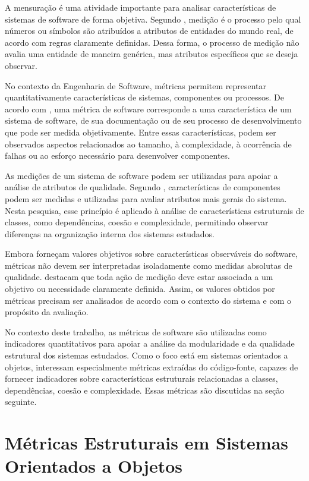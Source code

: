 A mensuração é uma atividade importante para analisar características de sistemas de software de forma objetiva. 
Segundo , medição é o processo pelo qual números ou símbolos são atribuídos a atributos de 
entidades do mundo real, de acordo com regras claramente definidas. Dessa forma, o processo de medição não avalia uma 
entidade de maneira genérica, mas atributos específicos que se deseja observar.

No contexto da Engenharia de Software, métricas permitem representar quantitativamente características de sistemas, componentes 
ou processos. De acordo com , uma métrica de software corresponde a uma característica de um sistema 
de software, de sua documentação ou de seu processo de desenvolvimento que pode ser medida objetivamente. Entre essas características, 
podem ser observados aspectos relacionados ao tamanho, à complexidade, à ocorrência de falhas ou ao esforço necessário para 
desenvolver componentes.

As medições de um sistema de software podem ser utilizadas para apoiar a análise de atributos de qualidade. Segundo 
, características de componentes podem ser medidas e utilizadas para avaliar atributos mais gerais 
do sistema. Nesta pesquisa, esse princípio é aplicado à análise de características estruturais de classes, como dependências, coesão 
e complexidade, permitindo observar diferenças na organização interna dos sistemas estudados.

Embora forneçam valores objetivos sobre características observáveis do software, métricas não devem ser interpretadas isoladamente 
como medidas absolutas de qualidade.  destacam que toda ação de medição deve estar associada a um objetivo 
ou necessidade claramente definida. Assim, os valores obtidos por métricas precisam ser analisados de acordo com o contexto do 
sistema e com o propósito da avaliação.

No contexto deste trabalho, as métricas de software são utilizadas como indicadores quantitativos para apoiar a análise da modularidade 
e da qualidade estrutural dos sistemas estudados. Como o foco está em sistemas orientados a objetos, interessam especialmente métricas 
extraídas do código-fonte, capazes de fornecer indicadores sobre características estruturais relacionadas a classes, dependências, coesão 
e complexidade. Essas métricas são discutidas na seção seguinte.

\section{Métricas Estruturais em Sistemas Orientados a Objetos}
\label{sec:metricas-estruturais-em-sistemas-orientados-a-objetos}

